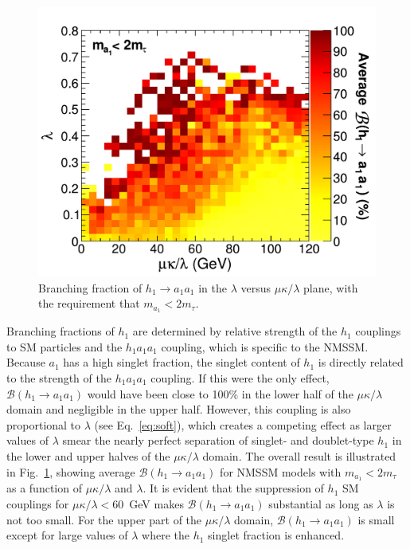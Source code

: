 \documentclass[aps,prl,twocolumn,nofootinbib,superscriptaddress]{revtex4}
\begin{document}
\begin{figure}[htb]
\includegraphics[width=0.95\linewidth]{plots/brhaa_vs_lambda_vs_mkoverl}
\caption{Branching fraction of $h_1 \to a_1a_1$ in the $\lambda$
  versus $\mu\kappa/\lambda$ plane, with the requirement that $m_{a_1}
  < 2m_\tau$. \label{fig:brhaa}}
\end{figure}

Branching fractions of $h_1$ are determined by relative strength of
the $h_1$ couplings to SM particles and the $h_1 a_1 a_1$ coupling,
which is specific to the NMSSM.  Because $a_1$ has a high singlet
fraction, the singlet content of $h_1$ is directly related to the
strength of the $h_1 a_1 a_1$ coupling. If this were the only effect,
$\mathcal{B}(h_1 \to a_1 a_1)$ would have been close to 100\% in the
lower half of the $\mu\kappa/\lambda$ domain and negligible in the
upper half.  However, this coupling is also proportional to $\lambda$
(see Eq.~\ref{eq:soft}), which creates a competing effect as larger
values of $\lambda$ smear the nearly perfect separation of singlet-
and doublet-type $h_1$ in the lower and upper halves of the
$\mu\kappa/\lambda$ domain.  The overall result is illustrated in
Fig.~\ref{fig:brhaa}, showing average $\mathcal{B}(h_1 \to a_1 a_1)$
for NMSSM models with $m_{a_1} < 2m_\tau$ as a function of
$\mu\kappa/\lambda$ and $\lambda$.  It is evident that the suppression
of $h_1$ SM couplings for $\mu\kappa/\lambda < 60$~GeV makes
$\mathcal{B}(h_1 \to a_1 a_1)$ substantial as long as $\lambda$ is not
too small.  For the upper part of the $\mu\kappa/\lambda$ domain,
$\mathcal{B}(h_1 \to a_1 a_1)$ is small except for large values of
$\lambda$ where the $h_1$ singlet fraction is enhanced.
\end{document}
